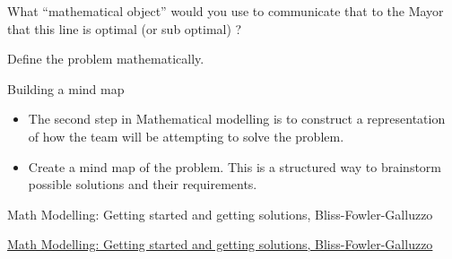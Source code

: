 \begin{parts}
	\item What ``mathematical object'' would you use to communicate that to the Mayor that this line is optimal (or sub optimal) ?

	\item Define the problem mathematically.
\end{parts}

















\newpage


%
%



\begin{module}{Building a mind map}
	\label{mindmap}

	
	
\end{module}



\begin{lesson}

	\begin{itemize}
		\item The second step in Mathematical modelling is to construct a representation of how the team will be attempting to solve the problem.
		\item Create a mind map of the problem. This is a structured way to brainstorm possible solutions and their requirements.
	\end{itemize}
	

\begin{annotation}
	\begin{goals}
	Math Modelling: Getting started and getting solutions, Bliss-Fowler-Galluzzo
	
	\hfill {}	
	\end{goals}
\end{annotation}
	 \href{https://m3challenge.siam.org/resources/modeling-handbook}{Math Modelling: Getting started and getting solutions, Bliss-Fowler-Galluzzo}

\end{lesson}





